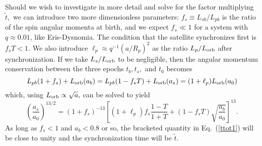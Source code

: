\documentclass[onecolumn]{aastex631}
\begin{document}
Should we wish to investigate in more detail and solve for the factor multiplying $\tilde t,$ we can introduce two more dimensionless parameters: $f_s\equiv L_{sb}/L_{pb}$ is the ratio of the spin angular momenta at birth, and we expect $f_s\ll 1$ for a system with $q\approx 0.01$, like Eris-Dysnomia.  The condition that the satellite synchronizes first is $f_sT<1.$
We also introduce $\ell_p \approx q^{-1} \left(a/R_p\right)^2$ as the ratio $L_p/L_{\rm orb}$ after synchronization.  If we take $L_s/L_{\rm orb}$ to be negligible, then the angular momentum conservation between the three epochs $t_b, t_s,$ and $t_0$ becomes
  \begin{equation}
    L_{pb}(1+f_s) + L_{\rm orb}(a_b) = L_{pb}(1-f_sT) + L_{\rm orb}(a_s) = (1+\ell_p) L_{\rm orb}(a_0)
  \end{equation}
  which, using $L_{\rm orb} \propto \sqrt{a},$ can be solved to yield
  \begin{equation}
    \left(\frac{a_s}{a_0}\right)^{13/2} = (1+f_s)^{-13} \left[ (1+\ell_p) f_s \frac{1-T}{1+T} + (1-f_sT)\sqrt{\frac{a_b}{a_0}}\right]^{13}.
    \label{asynch}
  \end{equation}
As long as $f_s<1$ and $a_b<0.8$ or so, the bracketed quantity in Eq.~(\ref{ttot1}) will be close to unity and the synchronization time will be $\tilde t.$


\allauthors
\end{document}
